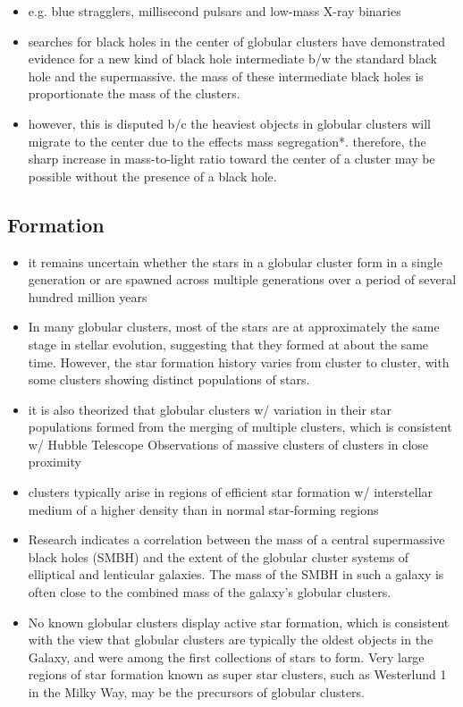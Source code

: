 \begin{itemize}[noitemsep]
\begin{itemize}[noitemsep]
			\item e.g.  blue stragglers, millisecond pulsars and low-mass X-ray binaries
			\item searches for black holes in the center of globular clusters have demonstrated evidence for a new kind of black hole intermediate b/w the standard black hole and the supermassive. the mass of these intermediate black holes is proportionate the mass of the clusters.
			\item however, this is disputed b/c the heaviest objects in globular clusters will migrate to the center due to the effects \gls{mass segregation}*. therefore, the sharp increase in mass-to-light ratio toward the center of a cluster may be possible without the presence of a black hole.
		\end{itemize}
\end{itemize}
\subsection{Formation}
\begin{itemize}[noitemsep]
	\item  it remains uncertain whether the stars in a globular cluster form in a single generation or are spawned across multiple generations over a period of several hundred million years
	\item  In many globular clusters, most of the stars are at approximately the same stage in stellar evolution, suggesting that they formed at about the same time. However, the star formation history varies from cluster to cluster, with some clusters showing distinct populations of stars.
	\item it is also theorized that globular clusters w/ variation in their star populations formed from the merging of multiple clusters, which is consistent w/ Hubble Telescope Observations of massive clusters of clusters in close proximity
	\item clusters typically arise in regions of efficient star formation w/ interstellar medium of a higher density than in normal star-forming regions
	\item Research indicates a correlation between the mass of a central supermassive black holes (SMBH) and the extent of the globular cluster systems of elliptical and lenticular galaxies. The mass of the SMBH in such a galaxy is often close to the combined mass of the galaxy's globular clusters.
	\item No known globular clusters display active star formation, which is consistent with the view that globular clusters are typically the oldest objects in the Galaxy, and were among the first collections of stars to form. Very large regions of star formation known as super star clusters, such as Westerlund 1 in the Milky Way, may be the precursors of globular clusters.
\end{itemize}